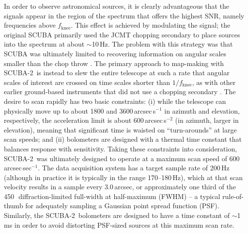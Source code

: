 \documentclass[useAMS,usenatbib,nofootinbib]{mn2e}
\newcommand{\snr}{SNR}
\newcommand{\scuba}{SCUBA-2}
\begin{document}
In order to observe astronomical sources, it is clearly advantageous
that the signals appear in the region of the spectrum that offers the
highest \snr, namely frequencies above $f_\mathrm{knee}$. This effect
is achieved by modulating the signal; the original SCUBA primarily
used the JCMT chopping secondary to place sources into the spectrum at
about $\sim$10\,Hz. The problem with this strategy was that SCUBA was
ultimately limited to recovering information on angular scales smaller
than the chop throw \citep[up to several arcmin,][]{holland1999}.  The
primary approach to map-making with \scuba\ is instead to slew the
entire telescope at such a rate that angular scales of interest are
crossed on time scales shorter than $1/f_\mathrm{knee}$, as with other
earlier ground-based instruments that did not use a chopping secondary
\citep[e.g.,][]{glenn1998,weferling2002,wilson2008,kovacs2008b}. The
desire to scan rapidly has two basic constraints: (i) while the
telescope can physically move up to about 1800 and
3600\,arcsec\,s$^{-1}$ in azimuth and elevation, respectively, the
acceleration limit is about 600\,arcsec\,s$^{-2}$ (in azimuth, larger
in elevation), meaning that significant time is waisted on
``turn-arounds'' at large scan speeds; and (ii) bolometers are
designed with a thermal time constant that balances response with
sensitivity. Taking these constraints into consideration, \scuba\ was
ultimately designed to operate at a maximum scan speed of
600\,arcsec\,sec$^{-1}$. The data acquisition system has a target
sample rate of 200\,Hz (although in practice it is typically in the
range 170--180\,Hz), which at that scan velocity results in a sample
every 3.0\,arcsec, or approximately one third of the 450\,\micron\
diffraction-limited full-width at half-maximum (FWHM) -- a typical
rule-of-thumb for adequately sampling a Gaussian point spread function
(PSF). Similarly, the \scuba\ bolometers are designed to have a time
constant of $\sim$1\,ms in order to avoid distorting PSF-sized sources
at this maximum scan rate.
\end{document}
